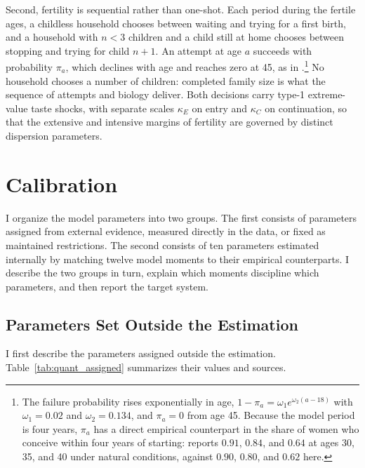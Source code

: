 \documentclass[11pt]{article}
\begin{document}
Second, fertility is sequential rather than one-shot. Each period during the
fertile ages, a childless household chooses between waiting and trying for a
first birth, and a household with $n<3$ children and a child still at home
chooses between stopping and trying for child $n+1$. An attempt at age $a$ succeeds with
probability $\pi_a$, which declines with age and reaches zero at 45, as in
\citet{sommer2016}.\footnote{The failure probability rises exponentially in
age, $1-\pi_a=\omega_1 e^{\omega_2(a-18)}$ with $\omega_1=0.02$ and
$\omega_2=0.134$, and $\pi_a=0$ from age 45. Because the model period is
four years, $\pi_a$ has a direct empirical counterpart in the share of women
who conceive within four years of starting: \citet{leridon2004} reports
$0.91$, $0.84$, and $0.64$ at ages 30, 35, and 40 under natural conditions,
against $0.90$, $0.80$, and $0.62$ here.}
No household chooses a number of children: completed family size is what the
sequence of attempts and biology deliver. Both decisions carry type-1
extreme-value taste shocks,
with separate scales $\kappa_E$ on entry and $\kappa_C$ on continuation, so
that the extensive and intensive margins of fertility are governed by
distinct dispersion parameters.

\section{Calibration}
\label{sec:quant_calibration}

I organize the model parameters into two groups. The first consists of
parameters assigned from external evidence, measured directly in the data, or
fixed as maintained restrictions. The second consists of ten parameters
estimated internally by matching twelve model moments to their empirical
counterparts. I describe the two groups in turn, explain which moments
discipline which parameters, and then report the target system.

\subsection{Parameters Set Outside the Estimation}

I first describe the parameters assigned outside the estimation.
Table~\ref{tab:quant_assigned} summarizes their values and sources.
\end{document}
